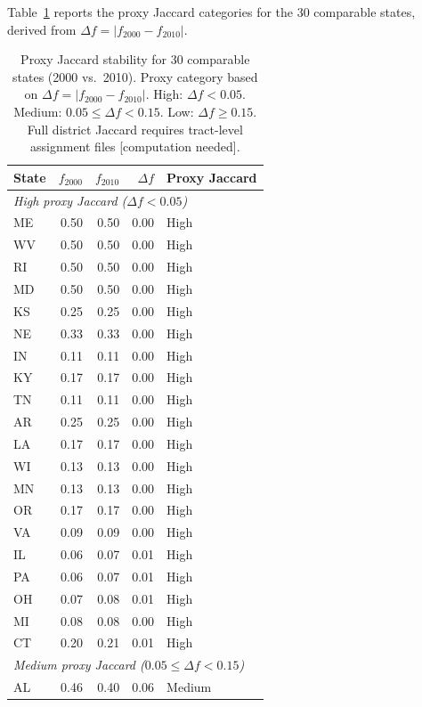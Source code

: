 Table~\ref{tab:proxy-jaccard} reports the proxy Jaccard categories for the
30 comparable states, derived from $\Delta f = |f_{2000} - f_{2010}|$.

\begin{table}[h]
\centering
\caption{Proxy Jaccard stability for 30 comparable states (2000 vs.\ 2010).
  Proxy category based on $\Delta f = |f_{2000} - f_{2010}|$.
  High: $\Delta f < 0.05$.
  Medium: $0.05 \leq \Delta f < 0.15$.
  Low: $\Delta f \geq 0.15$.
  Full district Jaccard requires tract-level assignment files [computation needed].}
\label{tab:proxy-jaccard}
\small
\begin{tabular}{l r r r l}
\toprule
State & $f_{2000}$ & $f_{2010}$ & $\Delta f$ & Proxy Jaccard \\
\midrule
\multicolumn{5}{l}{\textit{High proxy Jaccard ($\Delta f < 0.05$)}} \\
ME  & 0.50 & 0.50 & 0.00 & High \\
WV  & 0.50 & 0.50 & 0.00 & High \\
RI  & 0.50 & 0.50 & 0.00 & High \\
MD  & 0.50 & 0.50 & 0.00 & High \\
KS  & 0.25 & 0.25 & 0.00 & High \\
NE  & 0.33 & 0.33 & 0.00 & High \\
IN  & 0.11 & 0.11 & 0.00 & High \\
KY  & 0.17 & 0.17 & 0.00 & High \\
TN  & 0.11 & 0.11 & 0.00 & High \\
AR  & 0.25 & 0.25 & 0.00 & High \\
LA  & 0.17 & 0.17 & 0.00 & High \\
WI  & 0.13 & 0.13 & 0.00 & High \\
MN  & 0.13 & 0.13 & 0.00 & High \\
OR  & 0.17 & 0.17 & 0.00 & High \\
VA  & 0.09 & 0.09 & 0.00 & High \\
IL  & 0.06 & 0.07 & 0.01 & High \\
PA  & 0.06 & 0.07 & 0.01 & High \\
OH  & 0.07 & 0.08 & 0.01 & High \\
MI  & 0.08 & 0.08 & 0.00 & High \\
CT  & 0.20 & 0.21 & 0.01 & High \\
\midrule
\multicolumn{5}{l}{\textit{Medium proxy Jaccard ($0.05 \leq \Delta f < 0.15$)}} \\
AL  & 0.46 & 0.40 & 0.06 & Medium \\

\end{tabular}
\end{table}
